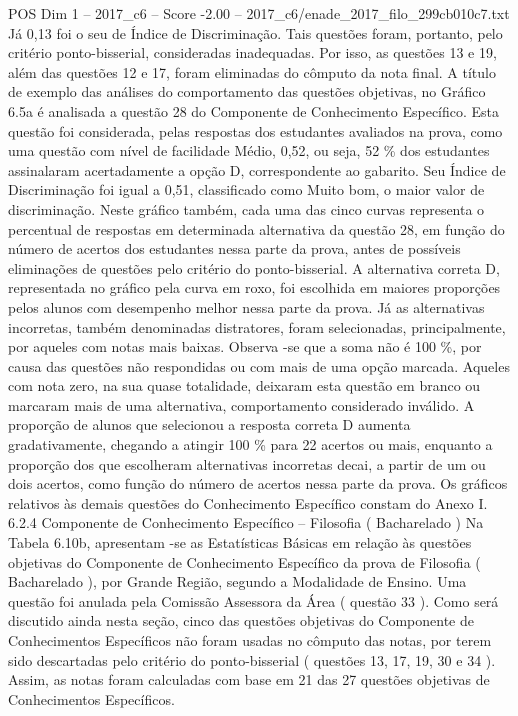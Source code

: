 \begin{textsample}{POS Dim 1 – 2017\_c6 – Score -2.00 – 2017\_c6/enade\_2017\_filo\_299cb010c7.txt}
Já 0,13 foi o seu de Índice de Discriminação.
Tais questões foram, portanto, pelo critério ponto-bisserial, consideradas inadequadas.
Por isso, as questões 13 e 19, além das questões 12 e 17, foram eliminadas do cômputo da nota final.
A título de exemplo das análises do comportamento das questões objetivas, no Gráfico 6.5a é analisada a questão 28 do Componente de Conhecimento Específico.
Esta questão foi considerada, pelas respostas dos estudantes avaliados na prova, como uma questão com nível de facilidade Médio, 0,52, ou seja, 52 \% dos estudantes assinalaram acertadamente a opção D, correspondente ao gabarito.
Seu Índice de Discriminação foi igual a 0,51, classificado como Muito bom, o maior valor de discriminação.
Neste gráfico também, cada uma das cinco curvas representa o percentual de respostas em determinada alternativa da questão 28, em função do número de acertos dos estudantes nessa parte da prova, antes de possíveis eliminações de questões pelo critério do ponto-bisserial.
A alternativa correta D, representada no gráfico pela curva em roxo, foi escolhida em maiores proporções pelos alunos com desempenho melhor nessa parte da prova.
Já as alternativas incorretas, também denominadas distratores, foram selecionadas, principalmente, por aqueles com notas mais baixas.
Observa -se que a soma não é 100 \%, por causa das questões não respondidas ou com mais de uma opção marcada.
Aqueles com nota zero, na sua quase totalidade, deixaram esta questão em branco ou marcaram mais de uma alternativa, comportamento considerado inválido.
A proporção de alunos que selecionou a resposta correta D aumenta gradativamente, chegando a atingir 100 \% para 22 acertos ou mais, enquanto a proporção dos que escolheram alternativas incorretas decai, a partir de um ou dois acertos, como função do número de acertos nessa parte da prova.
Os gráficos relativos às demais questões do Conhecimento Específico constam do Anexo I. 6.2.4 Componente de Conhecimento Específico – Filosofia ( Bacharelado ) Na Tabela 6.10b, apresentam -se as Estatísticas Básicas em relação às questões objetivas do Componente de Conhecimento Específico da prova de Filosofia ( Bacharelado ), por Grande Região, segundo a Modalidade de Ensino.
Uma questão foi anulada pela Comissão Assessora da Área ( questão 33 ).
Como será discutido ainda nesta seção, cinco das questões objetivas do Componente de Conhecimentos Específicos não foram usadas no cômputo das notas, por terem sido descartadas pelo critério do ponto-bisserial ( questões 13, 17, 19, 30 e 34 ).
Assim, as notas foram calculadas com base em 21 das 27 questões objetivas de Conhecimentos Específicos.

\end{textsample}
